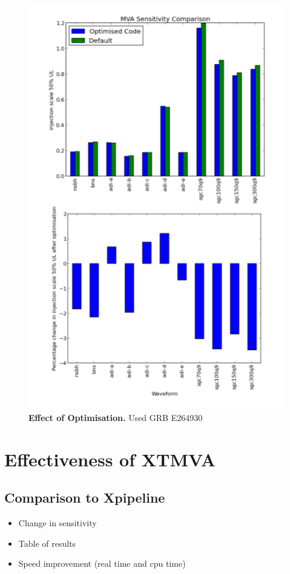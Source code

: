 \documentclass[11pt]{cuthesis}
\begin{document}
\begin{figure} %
\begin{center}
\includegraphics[width=0.8\linewidth]{opt_comparison.png}
\end{center}
\caption{\textbf{Effect of Optimisation.} Used GRB E264930  }
\label{fig:opt compare}
\end{figure}

\section{Effectiveness of XTMVA}
\subsection{Comparison to Xpipeline}
\begin{itemize}
\item Change in sensitivity
\item Table of results
\item Speed improvement (real time and cpu time)
\end{itemize}
\end{document}
